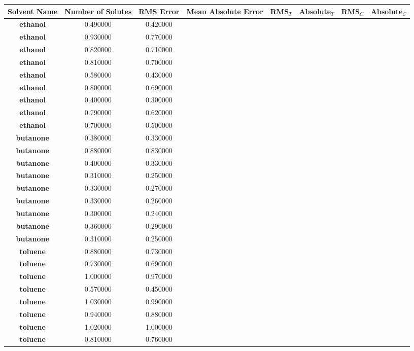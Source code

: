 \documentclass{amsart}
\begin{document}
 
\begin{center}
\begin{tabular}{c|c|c|c|c|c|c|c} 
\textbf{Solvent Name}&\textbf{Number of Solutes}&\textbf{RMS Error}&\textbf{Mean Absolute Error}&\textbf{RMS$_{T}$}&\textbf{Absolute$_{T}$}&\textbf{RMS$_{C}$}&\textbf{Absolute$_{C}$} \\ \hline
\hline 
\textbf{ethanol}&0.490000&0.420000 \\ \hline 
\textbf{ethanol}&0.930000&0.770000 \\ \hline 
\textbf{ethanol}&0.820000&0.710000 \\ \hline 
\textbf{ethanol}&0.810000&0.700000 \\ \hline 
\textbf{ethanol}&0.580000&0.430000 \\ \hline 
\textbf{ethanol}&0.800000&0.690000 \\ \hline 
\textbf{ethanol}&0.400000&0.300000 \\ \hline 
\textbf{ethanol}&0.790000&0.620000 \\ \hline 
\textbf{ethanol}&0.700000&0.500000 \\ \hline 
\textbf{butanone}&0.380000&0.330000 \\ \hline 
\textbf{butanone}&0.880000&0.830000 \\ \hline 
\textbf{butanone}&0.400000&0.330000 \\ \hline 
\textbf{butanone}&0.310000&0.250000 \\ \hline 
\textbf{butanone}&0.330000&0.270000 \\ \hline 
\textbf{butanone}&0.330000&0.260000 \\ \hline 
\textbf{butanone}&0.300000&0.240000 \\ \hline 
\textbf{butanone}&0.360000&0.290000 \\ \hline 
\textbf{butanone}&0.310000&0.250000 \\ \hline 
\textbf{toluene}&0.880000&0.730000 \\ \hline 
\textbf{toluene}&0.730000&0.690000 \\ \hline 
\textbf{toluene}&1.000000&0.970000 \\ \hline 
\textbf{toluene}&0.570000&0.450000 \\ \hline 
\textbf{toluene}&1.030000&0.990000 \\ \hline 
\textbf{toluene}&0.940000&0.880000 \\ \hline 
\textbf{toluene}&1.020000&1.000000 \\ \hline 
\textbf{toluene}&0.810000&0.760000 \\ \hline 

\end{tabular}
\end{center}
\end{document}
